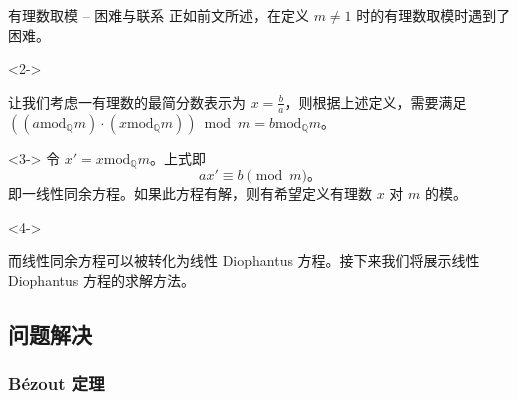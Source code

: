 \documentclass{../pkslide}
\begin{document}
\begin{frame}{有理数取模 -- 困难与联系}
  正如前文所述，在定义 $m \ne 1$ 时的有理数取模时遇到了困难。
  
  \begin{visibleenv}<2->
    \emptyline
    
    让我们考虑一有理数的最简分数表示为 $x = \frac{b}{a}$，则根据上述定义，需要满足 $((a \mathbin{\mathrm{mod}_{\mathbb Q}} m) \cdot (x \mathbin{\mathrm{mod}_{\mathbb Q}} m)) \bmod m = b \mathbin{\mathrm{mod}_{\mathbb Q}} m$。
  \end{visibleenv}
  
  \begin{visibleenv}<3->
    令 $x' = x \mathbin{\mathrm{mod}_{\mathbb Q}} m$。上式即%
    \[ a x' \equiv b \pmod{m} \text{。} \]
    即一线性同余方程。如果此方程有解，则有希望定义有理数 $x$ 对 $m$ 的模。
  \end{visibleenv}
  
  \begin{visibleenv}<4->
    \emptyline
    
    而线性同余方程可以被转化为线性 Diophantus 方程。接下来我们将展示线性 Diophantus 方程的求解方法。
  \end{visibleenv}
\end{frame}


\subsection{问题解决}
\subsubsection{Bézout 定理}

\end{document}
